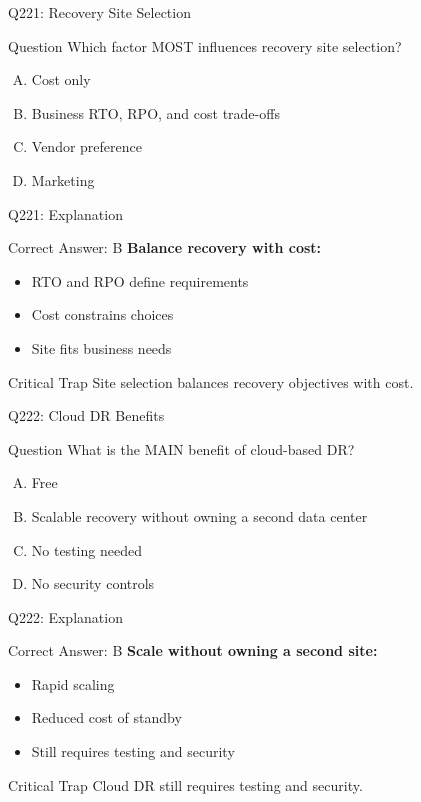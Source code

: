 \documentclass{beamer}
\begin{document}
	\begin{frame}{Q221: Recovery Site Selection}
		\begin{block}{Question}
			Which factor MOST influences recovery site selection?
		\end{block}
		\begin{enumerate}[(A)]
			\item Cost only
			\item Business RTO, RPO, and cost trade-offs
			\item Vendor preference
			\item Marketing
		\end{enumerate}
	\end{frame}
	
	\begin{frame}{Q221: Explanation}
		\begin{block}{Correct Answer: B}
			\textbf{Balance recovery with cost:}
			\begin{itemize}
				\item RTO and RPO define requirements
				\item Cost constrains choices
				\item Site fits business needs
			\end{itemize}
		\end{block}
		\begin{alertblock}{Critical Trap}
			Site selection balances recovery objectives with cost.
		\end{alertblock}
	\end{frame}
	
	\begin{frame}{Q222: Cloud DR Benefits}
		\begin{block}{Question}
			What is the MAIN benefit of cloud-based DR?
		\end{block}
		\begin{enumerate}[(A)]
			\item Free
			\item Scalable recovery without owning a second data center
			\item No testing needed
			\item No security controls
		\end{enumerate}
	\end{frame}
	
	\begin{frame}{Q222: Explanation}
		\begin{block}{Correct Answer: B}
			\textbf{Scale without owning a second site:}
			\begin{itemize}
				\item Rapid scaling
				\item Reduced cost of standby
				\item Still requires testing and security
			\end{itemize}
		\end{block}
		\begin{alertblock}{Critical Trap}
			Cloud DR still requires testing and security.
		\end{alertblock}
	\end{frame}
	
\end{document}
